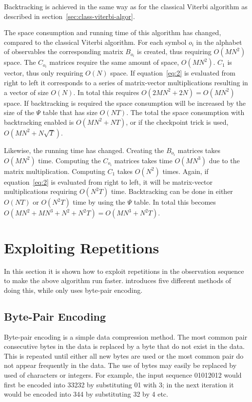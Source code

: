 Backtracking is achieved in the same way as for the classical Viterbi algorithm
as described in section~\ref{sec:class-viterbi-algor}.

The space consumption and running time of this algorithm has changed, compared
to the classical Viterbi algorithm. For each symbol $o_i$ in the alphabet of
observables the corresponding matrix $B_{o_i}$ is created, thus requiring
$O(M N^2)$ space. The $C_{o_i}$ matrices require the same amount of space,
$O(M N^2)$. $C_1$ is vector, thus only requiring $O(N)$ space. If
equation~\eqref{eq:2} is evaluated from right to left it corresponds to a
series of matrix-vector multiplications resulting in a vector of size $O(N)$.
In total this requires $O(2 M N^2 + 2 N) = O(M N^2)$ space. If backtracking is
required the space consumption will be increased by the size of the $\Psi$
table that has size $O(N T)$. The total the space consumption with backtracking
enabled is $O(M N^2 + N T)$, or if the checkpoint trick is used, $O(M N^2 +
N \sqrt{T})$.

Likewise, the running time has changed. Creating the $B_{o_i}$ matrices takes
$O(M N^2)$ time. Computing the $C_{o_i}$ matrices takes time $O(M N^3)$ due to
the matrix multiplication. Computing $C_1$ takes $O(N^2)$ times. Again, if
equation~\eqref{eq:2} is evaluated from right to left, it will be matrix-vector
multiplications requiring $O(N^2 T)$ time. Backtracking can be done in either
$O(NT)$ or $O(N^2 T)$ time by using the $\Psi$ table. In total this becomes
$O(M N^2 + M N^3 + N^2 + N^2 T) = O(M N^3 + N^2 T)$.

\section{Exploiting Repetitions}
\label{sec:expl-repet}

In this section it is shown how to exploit repetitions in the observation sequence
to make the above algorithm run faster. \citet{lifshits2009speeding} introduces
five different methods of doing this, while \citet{sand2013ziphmmlib} only uses
byte-pair encoding.

\subsection{Byte-Pair Encoding}

Byte-pair encoding is a simple data compression method. The most common pair
consecutive bytes in the data is replaced by a byte that do not exist in the
data. This is repeated until either all new bytes are used or the most common
pair do not appear frequently in the data. The use of bytes may easily be
replaced by used of characters or integers. For example, the input sequence
01012012 would first be encoded into 33232 by substituting 01 with 3; in the
next iteration it would be encoded into 344 by substituting 32 by 4 etc.

